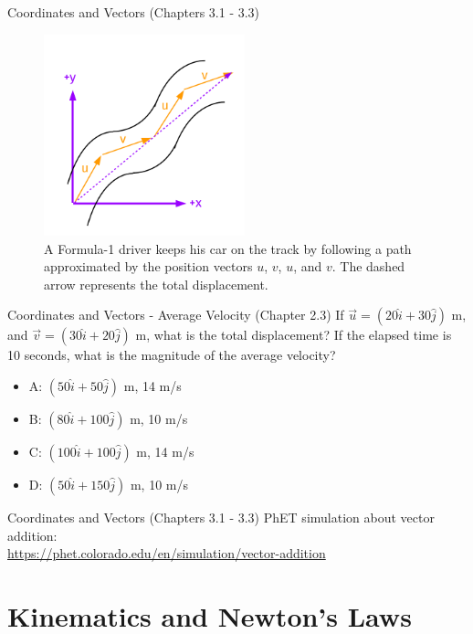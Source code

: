 \documentclass{beamer}
\begin{document}
\begin{frame}{Coordinates and Vectors (Chapters 3.1 - 3.3)}
\begin{figure}
\centering
\includegraphics[width=0.52\textwidth]{figures/AveVelocity.pdf}
\caption{\label{fig:avevel} A Formula-1 driver keeps his car on the track by following a path approximated by the position vectors $u$, $v$, $u$, and $v$.  The dashed arrow represents the total displacement.}
\end{figure}
\end{frame}

\begin{frame}{Coordinates and Vectors - Average Velocity (Chapter 2.3)}
If $\vec{u} = (20\hat{i}+30\hat{j})$ m, and $\vec{v} = (30\hat{i}+20\hat{j})$ m, what is the total displacement?  If the elapsed time is 10 seconds, what is the magnitude of the average velocity? \\
\vspace{0.2cm}
\begin{itemize}
\item A: $(50\hat{i} + 50\hat{j})$ m, 14 m/s
\item B: $(80\hat{i} + 100\hat{j})$ m, 10 m/s
\item C: $(100\hat{i} + 100\hat{j})$ m, 14 m/s
\item D: $(50\hat{i} + 150\hat{j})$ m, 10 m/s
\end{itemize}
\end{frame}

\begin{frame}{Coordinates and Vectors (Chapters 3.1 - 3.3)}
PhET simulation about vector addition: \\
\url{https://phet.colorado.edu/en/simulation/vector-addition}
\end{frame}

\section{Kinematics and Newton's Laws}
\end{document}
